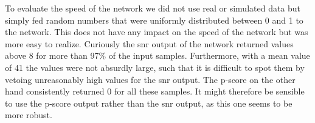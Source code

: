 To evaluate the speed of the network we did not use real or simulated data but simply fed random numbers that were uniformly distributed between 0 and 1 to the network. This does not have any impact on the speed of the network but was more easy to realize. Curiously the \gls{snr} output of the network returned values above 8 for more than 97\% of the input samples. Furthermore, with a mean value of 41 the values were not absurdly large, such that it is difficult to spot them by vetoing unreasonably high values for the \gls{snr} output. The p-score on the other hand consistently returned 0 for all these samples. It might therefore be sensible to use the p-score output rather than the \gls{snr} output, as this one seems to be more robust.
\newpage
$\ $
\newpage
